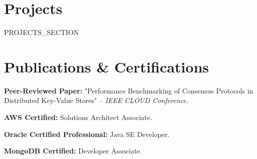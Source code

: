\documentclass[letterpaper,11pt]{article}
\newcommand{\resumeSubHeadingListStart}{\begin{itemize}[leftmargin=0pt, label={}]\vspace{-2pt}}
\newcommand{\resumeSubHeadingListEnd}{\end{itemize}\vspace{-3pt}}
\begin{document}
\section{Projects}
    \resumeSubHeadingListStart
{{PROJECTS_SECTION}}
    \resumeSubHeadingListEnd

\section{Publications \& Certifications}
 \begin{itemize}[leftmargin=0pt, label={}, itemsep=1.5pt, parsep=0pt]\vspace{-3pt}
    \small{
      \item \textbf{Peer-Reviewed Paper:} "Performance Benchmarking of Consensus Protocols in Distributed Key-Value Stores" -- \emph{IEEE CLOUD Conference.}
      \item \textbf{AWS Certified:} Solutions Architect Associate.
      \item \textbf{Oracle Certified Professional:} Java SE Developer.
      \item \textbf{MongoDB Certified:} Developer Associate.
    }
 \end{itemize}\vspace{-3pt}

\end{document}
